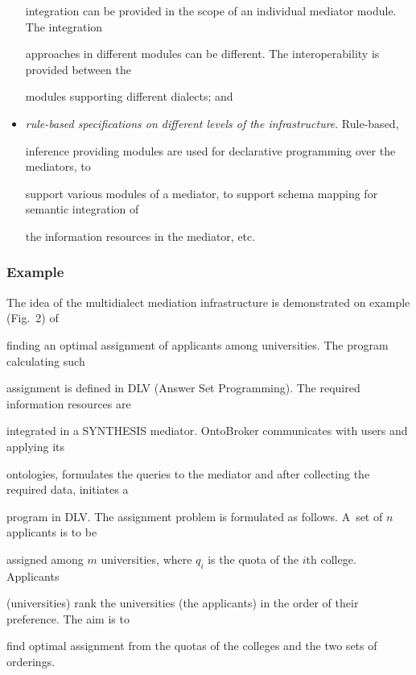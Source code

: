 \begin{multicols}{2}
\begin{itemize}
integration can be provided in the scope of an individual mediator module. The integration 

approaches in different modules can be different. The interoperability is provided between the 

modules supporting different dialects; and

\item \textit{rule-based specifications on different levels of the infrastructure}. Rule-based, 

inference providing modules are used for declarative programming over the mediators, to 

support various modules of a mediator, to support schema mapping for semantic integration of 

the information resources in the mediator, etc.

\end{itemize}



\subsubsection{Example}



\noindent

The idea of the multidialect mediation infrastructure is demonstrated on example (Fig.~2) of 

finding an optimal assignment of applicants among universities. The program calculating such 

assignment is defined in DLV (Answer Set Programming). The required information resources are 

integrated in a SYNTHESIS mediator. OntoBroker communicates with users and applying its 

ontologies, formulates the queries to the mediator and after collecting the required data, initiates a 

program in DLV. The assignment problem is formulated as follows. A~set of $n$ applicants is to be 

assigned among $m$ universities, where $q_i$ is the quota of the $i$th college. Applicants 

(universities) rank the universities (the applicants) in the order of their preference. The aim is to 

find optimal assignment from the quotas of the colleges and the two sets of orderings. 




\end{multicols}
